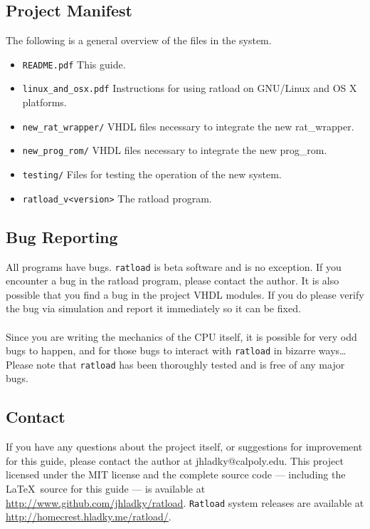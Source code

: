 \documentclass[notitlepage]{article}
\begin{document}
\subsection{Project Manifest}
The following is a general overview of the files in the system.
\begin{itemize}
\item \texttt{README.pdf} This guide.
\item \texttt{linux\_and\_osx.pdf} Instructions for using ratload on GNU/Linux and OS X platforms.
\item \texttt{new\_rat\_wrapper/} VHDL files necessary to integrate the new rat\_wrapper.
\item \texttt{new\_prog\_rom/} VHDL files necessary to integrate the new prog\_rom.
\item \texttt{testing/} Files for testing the operation of the new system.
\item \texttt{ratload\_v{\textless}version\textgreater} The ratload program.
\end{itemize}

\subsection{Bug Reporting}
All programs have bugs. \texttt{ratload} is beta software and is no exception. If you encounter a bug in the ratload program, please contact the author. It is also possible that you find a bug in the project VHDL modules. If you do please verify the bug via simulation and report it immediately so it can be fixed.\\\\
Since you are writing the mechanics of the CPU itself, it is possible for very odd bugs to happen, and for those bugs to interact with \texttt{ratload} in bizarre ways\ldots Please note that \texttt{ratload} has been thoroughly tested and is free of any major bugs.

\subsection{Contact}
If you have any questions about the project itself, or suggestions for improvement for this guide, please contact the author at jhladky@calpoly.edu. This project licensed under the MIT license and the complete source code --- including the \LaTeX ~source for this guide --- is available at \url{http://www.github.com/jhladky/ratload}. \texttt{Ratload} system releases are available at \url{http://homecrest.hladky.me/ratload/}.
\end{document}
